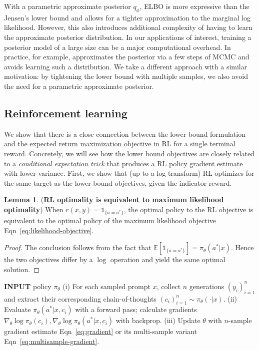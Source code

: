 \documentclass{article}
\theoremstyle{definition}
\newtheorem{lemma}[theorem]{Lemma}
\begin{document}
With a parametric approximate posterior $q_\phi$, ELBO is more expressive than the Jensen's lower bound and allows for a tighter approximation to the marginal log likelihood. However, this also introduces additional complexity of having to learn the approximate posterior distribution. In our applications of interest, training a posterior model of a large size can be a major computational overhead. In practice, for example, \citet{hoffman2024training} approximates the posterior via a few steps of MCMC and avoids learning such a distribution. We take a different approach with a similar motivation: by tightening the lower bound with multiple samples, we also avoid the need for a parametric approximate posterior.

\subsection{Reinforcement learning}

We show that there is a close connection between the lower bound formulation and the expected return  maximization objective in RL \citep{sutton1998} for a single terminal reward. Concretely, we will see how the lower bound objectives are closely related to a \emph{conditional expectation trick} that produces a RL policy gradient estimate with lower variance. First, we show that (up to a log transform) RL optimizes for the same target as the lower bound objectives, given the indicator reward.

\begin{lemma} (\textbf{RL optimality is equivalent to maximum likelihood optimality}) \label{lemma:equivalence-optimality}
When $r(x,y)=\mathds{1}_{\{a=a^\ast\}}$, the optimal policy to the RL objective is equivalent to the optimal policy of the maximum likelihood objective Eqn~\eqref{eq:likelihood-objective}.
\end{lemma}
\begin{proof}
    The conclusion follows from the fact that $\mathbb{E}\left[\mathds{1}_{\{a=a^\ast\}}\right]=\pi_\theta(a^*|x)$. Hence the two objectives differ by a $\log$ operation and yield the same optimal solution.
\end{proof}



\begin{algorithm}[t]
    \begin{algorithmic}[1]
        \STATE \textbf{INPUT} policy $\pi_\theta$
        \STATE (i) For each sampled prompt $x$, collect $n$ generations $(y_i)_{i=1}^n$ and extract their corresponding chain-of-thoughts $(c_i)_{i=1}^n\sim \pi_\theta(\cdot|x)$.
        \STATE (ii) Evaluate $\pi_\theta(a^*|x,c_i)$ with a forward pass; calculate gradients $\nabla_\theta \log \pi_\theta(c_i), \nabla_\theta \log \pi_\theta(a^*|x,c_i)$ with backprop.
        \STATE (iii) Update $\theta$ with $n$-sample  gradient estimate Eqn~\eqref{eq:gradient} or its multi-sample variant Eqn~\eqref{eq:multisample-gradient}.
        \ENDWHILE
    \end{algorithmic}
        \caption{JEPO: Jensen's evidence lower bound policy optimization (for both single-sample and multi-sample lower bounds)}\label{algo:online}
\end{algorithm}
\end{document}
